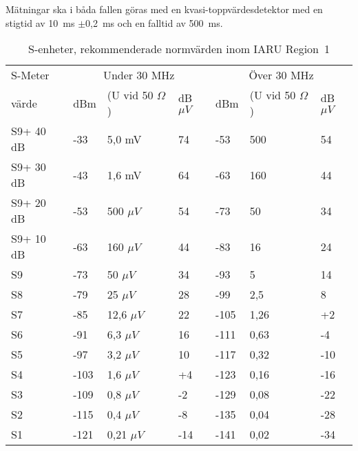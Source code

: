 Mätningar ska i båda fallen göras med en kvasi-toppvärdesdetektor
med en stigtid av 10~ms \(\pm\)0,2~ms och en falltid av 500~ms.

\begin{table}[h]
  \begin{tabular}{l|lll|lll}
    S-Meter  & \multicolumn{3}{c}{Under 30 MHz} & \multicolumn{3}{c}{Över 30 MHz} \\
    värde    & dBm & (U vid 50 \(\Omega\)) & dB\(\mu V\) & dBm & (U vid 50 \(\Omega\)) & dB\(\mu V\) \\
    \hline
    S9+ 40 dB & -33  & 5,0 mV  & 74  & -53  & 500  & 54  \\
    S9+ 30 dB & -43  & 1,6 mV  & 64  & -63  & 160  & 44  \\
    S9+ 20 dB & -53  & 500 \(\mu V\)  & 54  & -73  & 50   & 34  \\
    S9+ 10 dB & -63  & 160 \(\mu V\)  & 44  & -83  & 16   & 24  \\
    S9        & -73  & 50 \(\mu V\)   & 34  & -93  & 5    & 14  \\
    S8        & -79  & 25 \(\mu V\)   & 28  & -99  & 2,5  & 8   \\
    S7        & -85  & 12,6 \(\mu V\) & 22  & -105 & 1,26 & +2  \\
    S6        & -91  & 6,3 \(\mu V\)  & 16  & -111 & 0,63 & -4  \\
    S5        & -97  & 3,2 \(\mu V\)  & 10  & -117 & 0,32 & -10 \\
    S4        & -103 & 1,6 \(\mu V\)  & +4  & -123 & 0,16 & -16 \\
    S3        & -109 & 0,8 \(\mu V\)  & -2  & -129 & 0,08 & -22 \\
    S2        & -115 & 0,4 \(\mu V\)  & -8  & -135 & 0,04 & -28 \\
    S1        & -121 & 0,21 \(\mu V\) & -14 & -141 & 0,02 & -34 \\
  \end{tabular}
  \caption{S-enheter, rekommenderade normvärden inom IARU Region~1}
  \label{s-enhet tabell}
\end{table}
